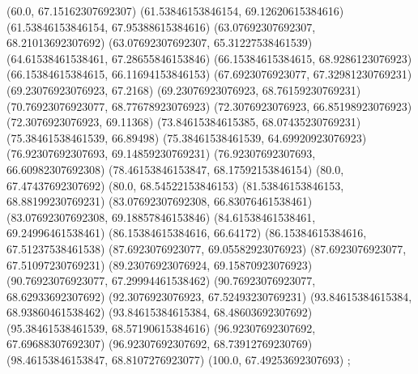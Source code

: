 {{{		(60.0, 67.15162307692307)
		(61.53846153846154, 69.12620615384616)
		(61.53846153846154, 67.95388615384616)
		(63.07692307692307, 68.21013692307692)
		(63.07692307692307, 65.31227538461539)
		(64.61538461538461, 67.28655846153846)
		(66.15384615384615, 68.9286123076923)
		(66.15384615384615, 66.11694153846153)
		(67.6923076923077, 67.32981230769231)
		(69.23076923076923, 67.2168)
		(69.23076923076923, 68.76159230769231)
		(70.76923076923077, 68.77678923076923)
		(72.3076923076923, 66.85198923076923)
		(72.3076923076923, 69.11368)
		(73.84615384615385, 68.07435230769231)
		(75.38461538461539, 66.89498)
		(75.38461538461539, 64.69920923076923)
		(76.92307692307693, 69.14859230769231)
		(76.92307692307693, 66.60982307692308)
		(78.46153846153847, 68.17592153846154)
		(80.0, 67.47437692307692)
		(80.0, 68.54522153846153)
		(81.53846153846153, 68.88199230769231)
		(83.07692307692308, 66.83076461538461)
		(83.07692307692308, 69.18857846153846)
		(84.61538461538461, 69.24996461538461)
		(86.15384615384616, 66.64172)
		(86.15384615384616, 67.51237538461538)
		(87.6923076923077, 69.05582923076923)
		(87.6923076923077, 67.51097230769231)
		(89.23076923076924, 69.15870923076923)
		(90.76923076923077, 67.29994461538462)
		(90.76923076923077, 68.62933692307692)
		(92.3076923076923, 67.52493230769231)
		(93.84615384615384, 68.93860461538462)
		(93.84615384615384, 68.48603692307692)
		(95.38461538461539, 68.57190615384616)
		(96.92307692307692, 67.69688307692307)
		(96.92307692307692, 68.73912769230769)
		(98.46153846153847, 68.8107276923077)
		(100.0, 67.49253692307693)
	};

}}
